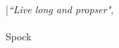 \documentclass[12pt, svgnames]{book}
\begin{document}
\newpage
\vspace*{\fill}
\centering
\Huge|\textit{``Live long and propser"}, 
\\~\\
\Large Spock
\vspace*{\fill}
\end{document}
